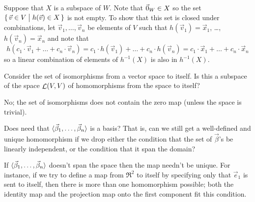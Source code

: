 \begin{exercises}
\begin{answer}
\begin{exparts}
          Suppose that \( X \) is a subspace of \( W \).
          Note that \( \vec{0}_W\in X \) so the set
          \( \mbox{$\{\,\vec{v}\in V \bigm| h(\vec{v})\in X\,\}$} \) is not empty.
          To show that this set is closed under combinations, let
          \( \vec{v}_1,\dots,\vec{v}_n \) be elements of \( V \)
          such that \( h(\vec{v}_1)=\vec{x}_1 \), \ldots,
          \( h(\vec{v}_n)=\vec{x}_n \) and note that 
          \begin{equation*}
            h(c_1\cdot \vec{v}_1+\dots+c_n\cdot \vec{v}_n)
            =c_1\cdot h(\vec{v}_1)+\dots+c_n\cdot h(\vec{v}_n)
            =c_1\cdot \vec{x}_1+\dots+c_n\cdot \vec{x}_n
          \end{equation*}
          so a linear combination of elements of \( h^{-1}(X) \) is also in
          \( h^{-1}(X) \).
      \end{exparts}  
     \end{answer}
  \item 
    Consider the set of isomorphisms from a vector space to itself.
    Is this a subspace of the space \( \mathop{{\cal L}}(V,V) \)
    of homomorphisms from the space to itself?
    \begin{answer}
      No; the set of isomorphisms does not contain the zero map
      (unless the space is trivial).
    \end{answer}
  \item 
   Does  need that
   $\langle\vec{\beta}_1,\ldots,\vec{\beta}_n\rangle$
   is a basis? 
   That is, can we still get a well-defined and unique homomorphism if we
   drop either the condition that the set of $\vec{\beta}$'s 
   be linearly independent, 
   or the condition that it span the domain?
   \begin{answer}
     If $\langle\vec{\beta}_1,\ldots,\vec{\beta}_n\rangle$ doesn't span the space
     then the map needn't be unique.
     For instance, if we try to define a map from $\Re^2$ to itself by 
     specifying only that $\vec{e}_1$ is sent to itself, then 
     there is more than
     one homomorphism possible; both the identity map and the projection map 
     onto the first component fit this condition.


\end{answer}
\end{exercises}
